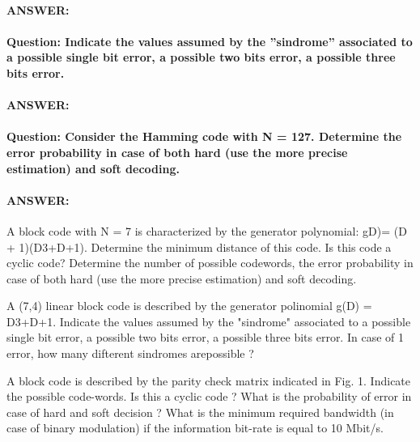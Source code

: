 \documentclass[colorlinks,11pt,a4paper,normalphoto,withhyper,ragged2e]{altareport}
\begin{document}
				\paragraph{ANSWER:}
				
				
				
				\paragraph{Question: Indicate the values assumed by the ”sindrome” associated to a possible single bit error, a possible two bits error, a possible three bits error.}
				\paragraph{ANSWER:}
				
				
				\paragraph{Question: Consider the Hamming code with N = 127. Determine the error probability in case of both hard (use the more precise estimation) and soft decoding.}
				\paragraph{ANSWER:}
				
				
				
			A block code with N = 7 is characterized by the generator polynomial: gD)= (D + 1)(D3+D+1). Determine the minimum distance of this code. Is this code a cyclic code? Determine the number of possible codewords, the error probability in case of both hard (use the more precise estimation) and soft decoding.
				
				
				
			A (7,4) linear block code is described by the generator polinomial g(D) = D3+D+1. Indicate the values assumed by the "sindrome" associated to a possible single bit error, a possible two bits error, a possible three bits error. In case of 1 error, how many difterent sindromes arepossible ?
				
				
				
				
				
				
				A block code is described by the parity check matrix indicated in Fig. 1. Indicate the possible code-words. Is this a cyclic code ? What is the probability of error in case of hard and soft decision ? What is the minimum required bandwidth (in case of binary modulation) if the information bit-rate is equal to 10 Mbit/s.
				
\end{document}
